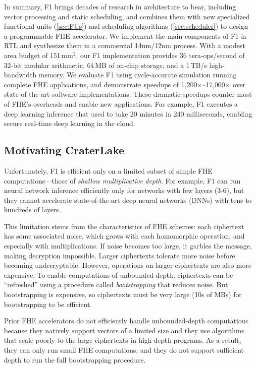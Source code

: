 In summary, F1 brings decades of research in architecture to bear, including
vector processing and static scheduling, and combines them with new specialized
functional units (\autoref{sec:FUs}) and scheduling algorithms
(\autoref{sec:scheduler}) to design a programmable FHE accelerator. We
implement the main components of F1 in RTL and synthesize them in a commercial
14nm/12nm process. With a modest area budget of 151\,mm$^2$, our F1
implementation provides 36 tera-ops/second of 32-bit modular arithmetic, 64\,MB
of on-chip storage, and a 1\,TB/s high-bandwidth memory. We evaluate F1 using
cycle-accurate simulation running complete FHE applications, and demonstrate
speedups of 1,200$\times$--17,000$\times$ over state-of-the-art software
implementations. These dramatic speedups counter most of FHE's overheads and
enable new applications. For example, F1 executes a deep learning inference
that used to take 20 minutes in 240 milliseconds, enabling secure real-time
deep learning in the cloud.

\subsection{Motivating CraterLake}

Unfortunately, F1 is efficient only on a limited subset of simple FHE
computations---those of \emph{shallow multiplicative depth}. For example, F1
can run neural network inference efficiently only for networks with few layers
(3-6), but they cannot accelerate state-of-the-art deep neural networks (DNNs)
with tens to hundreds of layers.

This limitation stems from the characteristics of FHE schemes: each ciphertext
has some associated noise, which grows with each homomorphic operation, and
especially with multiplications. If noise becomes too large, it garbles the
message, making decryption impossible. Larger ciphertexts tolerate more noise
before becoming undecryptable. However, operations on larger ciphertexts are
also more expensive. To enable computations of unbounded depth, ciphertexts can
be ``refreshed'' using a procedure called \emph{bootstrapping} that reduces
noise. But bootstrapping is expensive, so ciphertexts must be very large (10s
of MBs) for bootstrapping to be efficient.

Prior FHE accelerators do not efficiently handle unbounded-depth computations
because they natively support vectors of a limited size and they use algorithms
that scale poorly to the large ciphertexts in high-depth programs. As a result,
they can only run small FHE computations, and they do not support sufficient
depth to run the full bootstrapping procedure.


